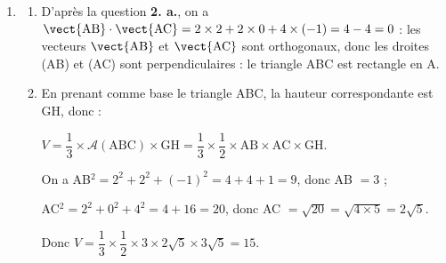 \begin{enumerate}
\begin{enumerate}
		Or GH$^2 = (3 - 7)^2 + (1 + 4)^2 + (6 - 4)^2 = 16 + 25 + 4 = 45$, d'où \\
		GH $= \sqrt{45} = \sqrt{9 \times 5} = \sqrt{9} \sqrt{5} = 3\sqrt{5}$.
	\end{enumerate}
\item
	\begin{enumerate}
		\item %
D'après la question \textbf{2. a.}, on a $\vect{\text{AB}} \cdot \vect{\text{AC}}  = 2 \times 2 + 2 \times 0 + 4 \times (- 1) = 4 - 4 = 0$ : les vecteurs $\vect{\text{AB}} $ et  $\vect{\text{AC}}$ sont orthogonaux, donc les droites (AB) et (AC) sont perpendiculaires : le triangle ABC est rectangle en A.

		\item %
En prenant comme base le triangle ABC, la hauteur correspondante est GH, donc :

$V = \dfrac13 \times \mathcal{A}(\text{ABC}) \times \text{GH} = \dfrac13 \times \dfrac12 \times \text{AB} \times \text{AC}  \times \text{GH}$.

On a AB$^2 = 2^2 + 2^2 + (- 1)^2 = 4 + 4 + 1 = 9$, donc AB $= 3$ ;

AC$^2 = 2^2 + 0^2 + 4^2 = 4 + 16 = 20$, donc AC $ = \sqrt{20} = \sqrt{4 \times 5} = 2\sqrt{5}$.

Donc $V = \dfrac13 \times \dfrac12 \times 3\times 2\sqrt{5}\times 3\sqrt{5} = 15$.
		
	\end{enumerate}
\end{enumerate}
